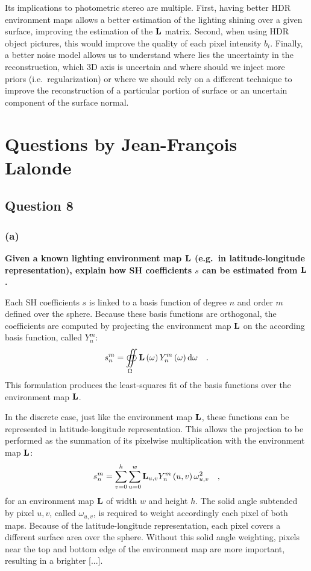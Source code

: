 \documentclass{report}
\begin{document}
Its implications to photometric stereo are multiple. First, having better HDR environment maps allows a better estimation of the lighting shining over a given surface, improving the estimation of the $\mathbf{L}$ matrix. Second, when using HDR object pictures, this would improve the quality of each pixel intensity $b_i$. Finally, a better noise model allows us to understand where lies the uncertainty in the reconstruction, which 3D axis is uncertain and where should we inject more priors (i.e.\ regularization) or where we should rely on a different technique to improve the reconstruction of a particular portion of surface or an uncertain component of the surface normal.

\chapter{Questions by Jean-François Lalonde}

\section{Question 8}
\subsection{(a)}
\textbf{Given a known lighting environment map $\mathbf{L}$ (e.g.\ in latitude-longitude representation), explain how SH coefficients $s$ can be estimated from $\mathbf{L}$.}

Each SH coefficients $s$ is linked to a basis function of degree $n$ and order $m$ defined over the sphere. Because these basis functions are orthogonal, the coefficients are computed by projecting the environment map $\mathbf{L}$ on the according basis function, called $Y_n^m$:
\begin{equation}
s_n^m = \oiint\limits_{\Omega} \mathbf{L}\left(\mathbf{\omega} \right) Y_n^m \left( \mathbf{\omega} \right) \mathrm{d} \mathbf{\omega}   \quad.
\end{equation}
This formulation produces the least-squares fit of the basis functions over the environment map $\mathbf{L}$.

In the discrete case, just like the environment map $\mathbf{L}$, these functions can be represented in latitude-longitude representation. This allows the projection to be performed as the summation of its pixelwise multiplication with the environment map $\mathbf{L}$:
\begin{equation}
s_n^m = \sum_{v=0}^{h} \sum_{u=0}^{w} \mathbf{L}_{u,v} Y_n^m\left(u, v\right) \omega_{u,v}^2 \quad,
\end{equation}
for an environment map $\mathbf{L}$ of width $w$ and height $h$. The solid angle subtended by pixel $u,v$, called $\omega_{u,v}$, is required to weight accordingly each pixel of both maps. Because of the latitude-longitude representation, each pixel covers a different surface area over the sphere. Without this solid angle weighting, pixels near the top and bottom edge of the environment map are more important, resulting in a brighter  [...].
\end{document}
